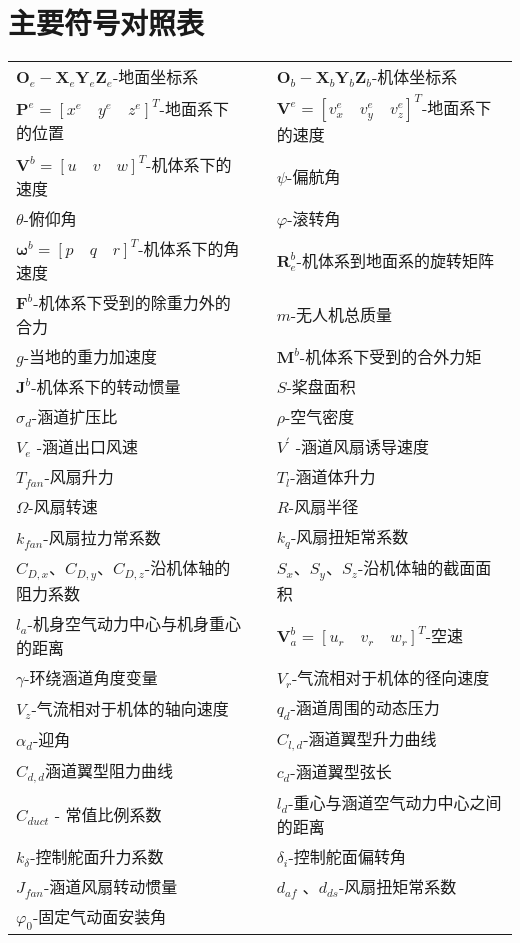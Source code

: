 \chapter{主要符号对照表}

\begin{table}
	\centering{}%
	\begin{tabular}{l>{\centering}p{0.5cm}l}
	 $ \boldsymbol{O}_e-\boldsymbol{X}_e\boldsymbol{Y}_e\boldsymbol{Z}_e $-地面坐标系  &  & ${\boldsymbol{O}_b}-{\boldsymbol{X}_b}{\boldsymbol{Y}_b}{\boldsymbol{Z}_b}$-机体坐标系\tabularnewline
     $\boldsymbol{P}^{e}=[{x}^{e} \quad {y}^{e} \quad {z}^{e}]^{T}$-地面系下的位置 &  & $\boldsymbol{V}^{e}=[{v}^{e}_{x} \quad {v}^{e}_{y} \quad {v}^{e}_{z}]^{T}$-地面系下的速度\tabularnewline
     $\boldsymbol{V}^{b}=[{u} \quad {v} \quad {w}]^{T}$-机体系下的速度 && $ \psi $-偏航角\tabularnewline
	 $\theta$-俯仰角                                                    && $\varphi$-滚转角\tabularnewline
     $\boldsymbol{\omega}^b=[p \quad q \quad r]^T$-机体系下的角速度 && $\boldsymbol{R}_e^b$-机体系到地面系的旋转矩阵\tabularnewline
	 $\boldsymbol{F}^b$-机体系下受到的除重力外的合力  							  &  &   $m $-无人机总质量\tabularnewline
	 $ g $-当地的重力加速度								&  &  $\boldsymbol{M}^b$-机体系下受到的合外力矩\tabularnewline
	 $\boldsymbol{J}^b$-机体系下的转动惯量 		    &  &   $S$-桨盘面积\tabularnewline
	 $ \sigma_d $-涵道扩压比 	&  &  $\rho$-空气密度\tabularnewline
	  $V_e$	-涵道出口风速							  &  &  $V^{\prime}$	-涵道风扇诱导速度\tabularnewline
      $T_{fan}$-风扇升力  						 &  &  $T_l$-涵道体升力\tabularnewline
	 $\Omega$-风扇转速 							 &  &  $R$-风扇半径\tabularnewline
	 $k_{fan}$-风扇拉力常系数 							 &  &  $k_{q}$-风扇扭矩常系数\tabularnewline
     $C_{D,x}$、$C_{D,y}$、$C_{D,z}$-沿机体轴的阻力系数  &  &  $S_x $、$ S_y $、$ S_z $-沿机体轴的截面面积\tabularnewline
	 $l_{a}$-机身空气动力中心与机身重心的距离   			  &  &  $\boldsymbol{V}_a^b= [ u_r \quad v_r \quad w_r ]^T$-空速\tabularnewline
     $\gamma$-环绕涵道角度变量 						  &  &  ${{V}_r}$-气流相对于机体的径向速度\tabularnewline 
    ${{V}_z}$-气流相对于机体的轴向速度   &  &  ${{q}_d}$-涵道周围的动态压力\tabularnewline
     $ \alpha_d $-迎角 							 &  &  $C_{l, d}$-涵道翼型升力曲线\tabularnewline
	 $C_{d, d}$涵道翼型阻力曲线  		      &  &  $c_d$-涵道翼型弦长\tabularnewline 
     $C_{d u c t}$ - 常值比例系数  					&  &  $l_{d}$-重心与涵道空气动力中心之间的距离\tabularnewline
	 $k_{\delta}$-控制舵面升力系数 				 &  &  $\delta_i$-控制舵面偏转角\tabularnewline
	 $ J_{fan}$-涵道风扇转动惯量  						   &  &  $ d_{af} $ 、$ d_{ds} $-风扇扭矩常系数\tabularnewline
	 ${\varphi}_{0}$-固定气动面安装角  						&  & \tabularnewline 					
	\end{tabular}
\end{table}